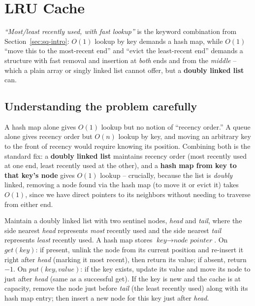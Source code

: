 \section{LRU Cache}
\label{sec:sq-lru-cache}


\begin{patternbox}
\emph{``Most/least recently used, with fast lookup''} is the keyword
combination from Section~\ref{sec:sq-intro}: $O(1)$ lookup by key demands
a hash map, while $O(1)$ ``move this to the most-recent end'' and
``evict the least-recent end'' demands a structure with fast removal and
insertion at \emph{both} ends and from the \emph{middle} -- which a plain
array or singly linked list cannot offer, but a \textbf{doubly linked
list} can.
\end{patternbox}

\subsection*{Understanding the problem carefully}

A hash map alone gives $O(1)$ lookup but no notion of ``recency
order.'' A queue alone gives recency order but $O(n)$ lookup by key, and
moving an arbitrary key to the front of recency would require knowing its
position. Combining both is the standard fix: a \textbf{doubly linked
list} maintains recency order (most recently used at one end, least
recently used at the other), and a \textbf{hash map from key to that
key's node} gives $O(1)$ lookup -- crucially, because the list is
\emph{doubly} linked, removing a node found via the hash map (to move it
or evict it) takes $O(1)$, since we have direct pointers to its neighbors
without needing to traverse from either end.

\begin{ideabox}
Maintain a doubly linked list with two sentinel nodes, \textit{head} and
\textit{tail}, where the side nearest \textit{head} represents
\emph{most} recently used and the side nearest \textit{tail} represents
\emph{least} recently used. A hash map stores $\textit{key} \to
\textit{node pointer}$. On $\textit{get}(\textit{key})$: if present,
unlink the node from its current position and re-insert it right after
\textit{head} (marking it most recent), then return its value; if absent,
return $-1$. On $\textit{put}(\textit{key}, \textit{value})$: if the key
exists, update its value and move its node to just after \textit{head}
(same as a successful get). If the key is new and the cache is at
capacity, remove the node just before \textit{tail} (the least recently
used) along with its hash map entry; then insert a new node for this key
just after \textit{head}.
\end{ideabox}

